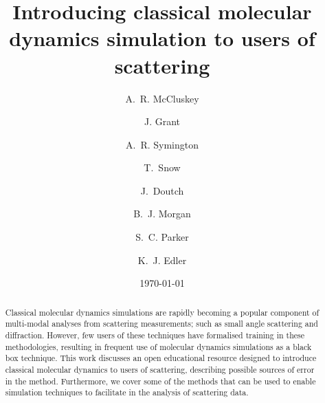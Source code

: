 \documentclass[amsmath,amssymb,twocolumn,superscriptaddress]{revtex4-1}
\begin{document}

\title{Introducing classical molecular dynamics simulation to users of
scattering}

\author{A.~R. McCluskey}

\author{J. Grant}

\author{A.~R. Symington}

\author{T.~Snow}

\author{J.~Doutch}

\author{B.~J. Morgan}

\author{S.~C. Parker}

\author{K.~J. Edler}

\date{\today}

\begin{abstract}
\noindent Classical molecular dynamics simulations are rapidly becoming a popular component of multi-modal analyses from scattering measurements; such as small angle scattering and diffraction.
However, few users of these techniques have formalised training in these methodologies, resulting in frequent use of molecular dynamics simulations as a black box technique.
This work discusses an open educational resource designed to introduce classical molecular dynamics to users of scattering, describing possible sources of error in the method.
Furthermore, we cover some of the methods that can be used to enable simulation techniques to facilitate in the analysis of scattering data.
\end{abstract}

\maketitle                        %
\end{document}
